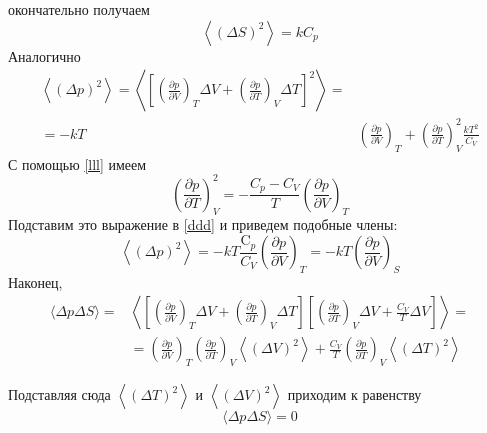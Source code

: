\documentclass[a4paper,12pt]{article} %
\begin{document}
\begin{ttask}
окончательно получаем
$$
\left\langle(\Delta S)^{2}\right\rangle=k C_{p}
$$
Аналогично
\begin{equation}\label{ddd}
\begin{aligned}
\left\langle(\Delta p)^{2}\right\rangle=
\left\langle\left[
\left(\frac{\partial p}{\partial V}\right)_{T} \Delta V+
\left(\frac{\partial p}{\partial T}\right)_{V} \Delta T
\right]^{2}\right\rangle=\\
=-k T&
\left(\frac{\partial p}{\partial V}\right)_{T}+
\left(\frac{\partial p}{\partial T}\right)_{V}^{2} 
\frac{k T^{2}}{C_{V}}
\end{aligned}
\end{equation}
С помощью \ref{lll} имеем
$$
\left(\frac{\partial p}{\partial T}\right)_{V}^{2}=-\frac{C_{p}-C_{V}}{T}\left(\frac{\partial p}{\partial V}\right)_{T}
$$
Подставим это выражение в \ref{ddd} и приведем подобные члены:
$$
\left\langle(\Delta p)^{2}\right\rangle=-k T \frac{\mathrm{C}_{p}}{C_{V}}\left(\frac{\partial p}{\partial V}\right)_{T}=-k T\left(\frac{\partial p}{\partial V}\right)_{S}
$$
Наконец,
$$
\begin{aligned}
\langle \Delta p \Delta S\rangle=&
\left\langle 
\left[\left(\frac{\partial p}{\partial V}\right)_{T} \Delta V+\left(\frac{\partial p}{\partial T}\right)_{V} \Delta T\right]
\left[\left(\frac{\partial p}{\partial T}\right)_{V} \Delta V+\frac{C_{V}}{T} \Delta V\right]
\right\rangle=\\
&=\left(\frac{\partial p}{\partial V}\right)_{T}\left(\frac{\partial p}{\partial T}\right)_{V}\left\langle(\Delta V)^{2}\right\rangle+\frac{C_{V}}{T}\left(\frac{\partial p}{\partial T}\right)_{V}\left\langle(\Delta T)^{2}\right\rangle
\end{aligned}
$$

Подставляя сюда $ \left\langle(\Delta T)^{2}\right\rangle $  и $ \left\langle(\Delta V)^{2}\right\rangle $  приходим к равенству
$$
\langle\Delta p \Delta S\rangle=0
$$



\end{ttask}
\end{document}

